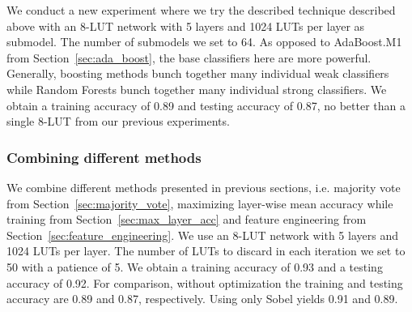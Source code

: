 We conduct a new experiment where we try the described technique described above with an 8-LUT network with 5 layers and 1024 LUTs per layer as submodel. The number of submodels we set to 64. As opposed to AdaBoost.M1 from Section~\ref{sec:ada_boost}, the base classifiers here are more powerful. Generally, boosting methods bunch together many individual weak classifiers while Random Forests bunch together many individual strong classifiers. We obtain a training accuracy of 0.89 and testing accuracy of 0.87, no better than a single 8-LUT from our previous experiments.

\subsubsection{Combining different methods}
We combine different methods presented in previous sections, i.e. majority vote from Section~\ref{sec:majority_vote}, maximizing layer-wise mean accuracy while training from Section~\ref{sec:max_layer_acc} and feature engineering from Section~\ref{sec:feature_engineering}. We use an 8-LUT network with 5 layers and 1024 LUTs per layer. The number of LUTs to discard in each iteration we set to 50 with a patience of 5. We obtain a training accuracy of 0.93 and a testing accuracy of 0.92. For comparison, without optimization the training and testing accuracy are 0.89 and 0.87, respectively. Using only Sobel yields 0.91 and 0.89.
